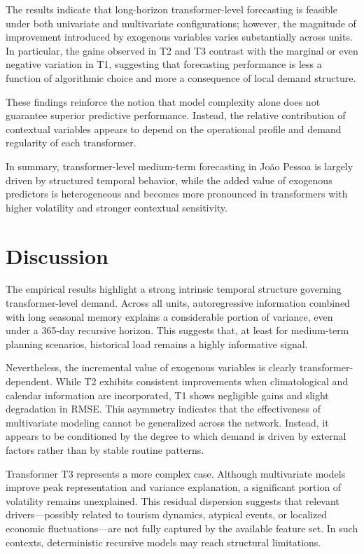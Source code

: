 The results indicate that long-horizon transformer-level forecasting is feasible under both univariate and multivariate configurations; however, the magnitude of improvement introduced by exogenous variables varies substantially across units. In particular, the gains observed in T2 and T3 contrast with the marginal or even negative variation in T1, suggesting that forecasting performance is less a function of algorithmic choice and more a consequence of local demand structure.

These findings reinforce the notion that model complexity alone does not guarantee superior predictive performance. Instead, the relative contribution of contextual variables appears to depend on the operational profile and demand regularity of each transformer.

In summary, transformer-level medium-term forecasting in João Pessoa is largely driven by structured temporal behavior, while the added value of exogenous predictors is heterogeneous and becomes more pronounced in transformers with higher volatility and stronger contextual sensitivity.


\section{Discussion}
\label{sec:discussion}

The empirical results highlight a strong intrinsic temporal structure governing transformer-level demand. Across all units, autoregressive information combined with long seasonal memory explains a considerable portion of variance, even under a 365-day recursive horizon. This suggests that, at least for medium-term planning scenarios, historical load remains a highly informative signal.

Nevertheless, the incremental value of exogenous variables is clearly transformer-dependent. While T2 exhibits consistent improvements when climatological and calendar information are incorporated, T1 shows negligible gains and slight degradation in RMSE. This asymmetry indicates that the effectiveness of multivariate modeling cannot be generalized across the network. Instead, it appears to be conditioned by the degree to which demand is driven by external factors rather than by stable routine patterns.

Transformer T3 represents a more complex case. Although multivariate models improve peak representation and variance explanation, a significant portion of volatility remains unexplained. This residual dispersion suggests that relevant drivers—possibly related to tourism dynamics, atypical events, or localized economic fluctuations—are not fully captured by the available feature set. In such contexts, deterministic recursive models may reach structural limitations.

